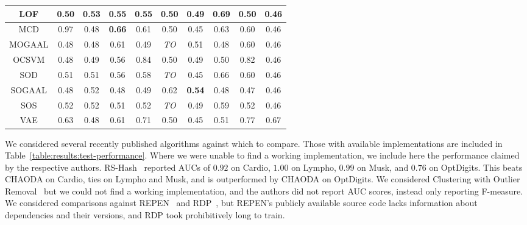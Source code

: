 \begin{table*}[!t]
\begin{center}
\begin{small}
\begin{sc}
\begin{tabular}{|c|c|c|c|c|c|c|c|c|c|}
\hline
LOF            &          0.50 &               0.53 &          0.55 &              0.55 &          0.50 &          0.49 &            0.69 &          0.50 &          0.46 \\
\hline
MCD            &          0.97 &               0.48 & \textbf{0.66} &              0.61 &          0.50 &          0.45 &            0.63 &          0.60 &          0.46 \\
\hline
MOGAAL         &          0.48 &               0.48 &          0.61 &              0.49 &   \textit{TO} &          0.51 &            0.48 &          0.60 &          0.46 \\
\hline
OCSVM          &          0.48 &               0.49 &          0.56 &              0.84 &          0.50 &          0.49 &            0.50 &          0.82 &          0.46 \\
\hline
SOD            &          0.51 &               0.51 &          0.56 &              0.58 &   \textit{TO} &          0.45 &            0.66 &          0.60 &          0.46 \\
\hline
SOGAAL         &          0.48 &               0.52 &          0.48 &              0.49 &          0.62 & \textbf{0.54} &            0.48 &          0.47 &          0.46 \\
\hline
SOS            &          0.52 &               0.52 &          0.51 &              0.52 &   \textit{TO} &          0.49 &            0.59 &          0.52 &          0.46 \\
\hline
VAE            &          0.63 &               0.48 &          0.61 &              0.71 &          0.50 &          0.45 &            0.51 &          0.77 &          0.67 \\
\hline
\end{tabular}
\end{sc}
\end{small}
\end{center}
\vskip -0.1in
\end{table*}

We considered several recently published algorithms against which to compare.
Those with available implementations are included in Table~\ref{table:results:test-performance}.
Where we were unable to find a working implementation, we include here the performance claimed by the respective authors.
RS-Hash~\cite{sathe2016subspace} reported AUCs of $0.92$ on Cardio, $1.00$ on Lympho, $0.99$ on Musk, and $0.76$ on OptDigits.
This beats CHAODA on Cardio, ties on Lympho and Musk, and is outperformed by CHAODA on OptDigits.
We considered Clustering with Outlier Removal~\cite{liu2019clustering} but we could not find a working implementation, and the authors did not report AUC scores, instead only reporting F-measure.
We considered comparisons against REPEN~\cite{pang2018learning} and RDP~\cite{wang2019unsupervised}, but REPEN's publicly available source code lacks information about dependencies and their versions, and RDP took prohibitively long to train.
